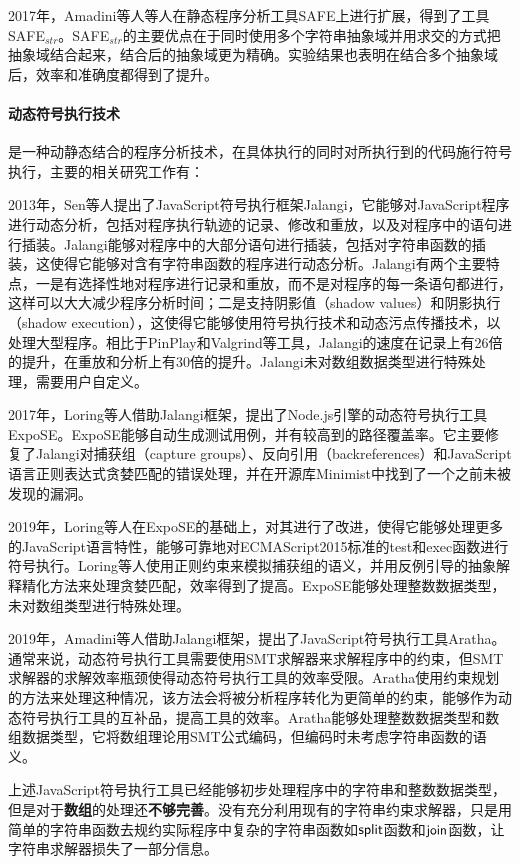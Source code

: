 2017年，Amadini等人\cite{safe_str}等人在静态程序分析工具SAFE上进行扩展，得到了工具SAFE$_{str}$。SAFE$_{str}$的主要优点在于同时使用多个字符串抽象域并用求交的方式把抽象域结合起来，结合后的抽象域更为精确。实验结果也表明在结合多个抽象域后，效率和准确度都得到了提升。

\paragraph{动态符号执行技术} 是一种动静态结合的程序分析技术，在具体执行的同时对所执行到的代码施行符号执行，主要的相关研究工作有：

2013年，Sen等人\cite{jalangi}提出了JavaScript符号执行框架Jalangi，它能够对JavaScript程序进行动态分析，包括对程序执行轨迹的记录、修改和重放，以及对程序中的语句进行插装。Jalangi能够对程序中的大部分语句进行插装，包括对字符串函数的插装，这使得它能够对含有字符串函数的程序进行动态分析。Jalangi有两个主要特点，一是有选择性地对程序进行记录和重放，而不是对程序的每一条语句都进行，这样可以大大减少程序分析时间；二是支持阴影值（shadow values）和阴影执行（shadow execution），这使得它能够使用符号执行技术和动态污点传播技术，以处理大型程序。相比于PinPlay\cite{pinplay}和Valgrind\cite{valgrind}等工具，Jalangi的速度在记录上有26倍的提升，在重放和分析上有30倍的提升。Jalangi未对数组数据类型进行特殊处理，需要用户自定义。

2017年，Loring等人\cite{expose_2017}借助Jalangi框架，提出了Node.js引擎的动态符号执行工具ExpoSE。ExpoSE能够自动生成测试用例，并有较高到的路径覆盖率。它主要修复了Jalangi对捕获组（capture groups）、反向引用（backreferences）和JavaScript语言正则表达式贪婪匹配的错误处理，并在开源库Minimist中找到了一个之前未被发现的漏洞。

2019年，Loring等人\cite{expose_2019}在ExpoSE的基础上，对其进行了改进，使得它能够处理更多的JavaScript语言特性，能够可靠地对ECMAScript2015标准的test和exec函数进行符号执行。Loring等人使用正则约束来模拟捕获组的语义，并用反例引导的抽象解释精化方法来处理贪婪匹配，效率得到了提高。ExpoSE能够处理整数数据类型，未对数组类型进行特殊处理。

2019年，Amadini等人\cite{aratha}借助Jalangi框架，提出了JavaScript符号执行工具Aratha。通常来说，动态符号执行工具需要使用SMT求解器来求解程序中的约束，但SMT求解器的求解效率瓶颈使得动态符号执行工具的效率受限。Aratha使用约束规划的方法来处理这种情况，该方法会将被分析程序转化为更简单的约束，能够作为动态符号执行工具的互补品，提高工具的效率。Aratha能够处理整数数据类型和数组数据类型，它将数组理论用SMT公式编码，但编码时未考虑字符串函数的语义。

上述JavaScript符号执行工具已经能够初步处理程序中的字符串和整数数据类型，但是对于\textbf{数组}的处理还\textbf{不够完善}。没有充分利用现有的字符串约束求解器，只是用简单的字符串函数去规约实际程序中复杂的字符串函数如$\mathsf{split}$函数和$\mathsf{join}$函数，让字符串求解器损失了一部分信息。

